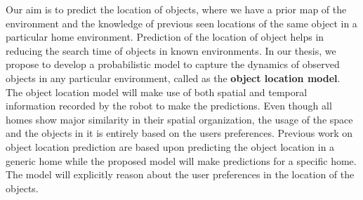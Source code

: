 \specialhead{\abstractname}

Our aim is to predict the location of objects, where we have a prior map of the
environment and the knowledge of previous seen locations of the same object in
a particular home environment. Prediction of the location of object helps in
reducing the search time of objects in known environments.
 In our thesis, we propose to develop a
probabilistic model to capture the dynamics of observed objects in any
particular environment, called as the \textbf{object location model}.
The object location model will make use of both spatial and temporal information
recorded by the robot to make the predictions.
Even though all homes show major similarity in
their spatial organization, the usage of the space and the objects in it is
entirely based on the users preferences. Previous work on object location prediction are based upon predicting the object location in a generic home while the proposed model will make predictions for a specific home. The model will
explicitly reason about the user preferences in the location of the objects.
